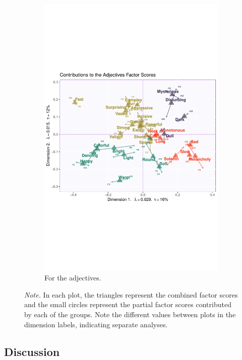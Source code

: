 \documentclass[
  english,
  man,floatsintext]{apa6}
\begin{document}
\begin{figure}
\begin{subfigure}[b]{0.45\textwidth}
         \includegraphics[width=\textwidth]{./Music-Descriptor-Space_files/figure-latex/mfasbs-2}
         \caption{For the adjectives.}
         \label{fig:adjectivespfs}
     \end{subfigure}
    \label{fig:mfasbs}
      \caption*{\footnotesize \textit{Note.}  In each plot, the triangles represent the combined factor scores and the small circles represent the partial factor scores contributed by each of the groups. Note the different values between plots in the dimension labels, indicating separate analyses.}
\end{figure}

\hypertarget{discussion-1}{%
\subsection{Discussion}\label{discussion-1}}
\end{document}
